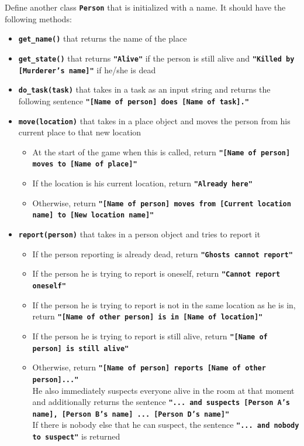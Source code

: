 Define another class \texttt{\bfseries Person} that is initialized with a name. It should have the following
methods:
\begin{itemize}
\item \texttt{\bfseries get\_name()} that returns the name of the place
\item \texttt{\bfseries get\_state()} that returns \texttt{\bfseries "Alive"} if the person is still alive and 
\texttt{\bfseries "Killed by [Murderer's name]"} if he/she is dead
\item \texttt{\bfseries do\_task(task)} that takes in a task as an input string and returns the following
sentence \texttt{\bfseries "[Name of person] does [Name of task]."}
\item \texttt{\bfseries move(location)} that takes in a place object and moves the person from his current
place to that new location
\begin{itemize}
\item At the start of the game when this is called, return \texttt{\bfseries "[Name of person]
moves to [Name of place]"}
\item If the location is his current location, return \texttt{\bfseries "Already here"}
\item Otherwise, return \texttt{\bfseries "[Name of person] moves from [Current location name] to [New location name]"}
\end{itemize}
\item \texttt{\bfseries report(person)} that takes in a person object and tries to report it
\begin{itemize}
\item If the person reporting is already dead, return \texttt{\bfseries "Ghosts cannot report"}
\item If the person he is trying to report is oneself, return \texttt{\bfseries "Cannot report oneself"}
\item If the person he is trying to report is not in the same location as he is in, return
\texttt{\bfseries "[Name of other person] is in [Name of location]"}
\item If the person he is trying to report is still alive, return \texttt{\bfseries "[Name of person]
is still alive"}
\item Otherwise, return \texttt{\bfseries "[Name of person] reports [Name of other
person]..."} \\
He also immediately suspects everyone alive in the room at that moment and additionally returns the sentence 
\texttt{\bfseries "... and suspects [Person A's name], [Person B's name] ... [Person D's name]"} \\
If there is nobody else that he can suspect, the sentence \texttt{\bfseries "... and
nobody to suspect"} is returned
\end{itemize}
\end{itemize}

